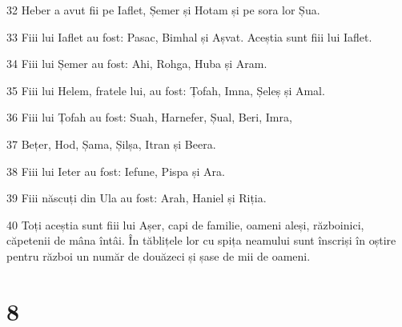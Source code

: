 \par 32 Heber a avut fii pe Iaflet, Șemer și Hotam și pe sora lor Șua.
\par 33 Fiii lui Iaflet au fost: Pasac, Bimhal și Așvat. Aceștia sunt fiii lui Iaflet.
\par 34 Fiii lui Șemer au fost: Ahi, Rohga, Huba și Aram.
\par 35 Fiii lui Helem, fratele lui, au fost: Țofah, Imna, Șeleș și Amal.
\par 36 Fiii lui Țofah au fost: Suah, Harnefer, Șual, Beri, Imra,
\par 37 Bețer, Hod, Șama, Șilșa, Itran și Beera.
\par 38 Fiii lui Ieter au fost: Iefune, Pispa și Ara.
\par 39 Fiii născuți din Ula au fost: Arah, Haniel și Riția.
\par 40 Toți aceștia sunt fiii lui Așer, capi de familie, oameni aleși, războinici, căpetenii de mâna întâi. În tăblițele lor cu spița neamului sunt înscriși în oștire pentru război un număr de douăzeci și șase de mii de oameni.

\chapter{8}

